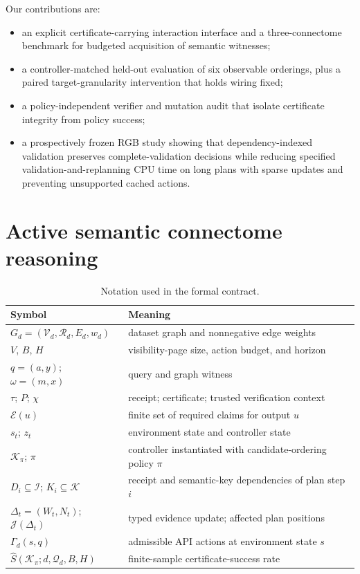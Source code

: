 \documentclass{article}
\begin{document}
Our contributions are:

\begin{itemize}[leftmargin=*,itemsep=1pt,topsep=2pt]
  \item an explicit certificate-carrying interaction interface and a
  three-connectome benchmark for budgeted acquisition of semantic witnesses;
  \item a controller-matched held-out evaluation of six observable
  orderings, plus a paired target-granularity intervention that holds wiring fixed;
  \item a policy-independent verifier and mutation audit that isolate certificate integrity
  from policy success;
  \item a prospectively frozen RGB study showing that dependency-indexed
  validation preserves complete-validation decisions while reducing specified
  validation-and-replanning CPU time on long plans with sparse updates and preventing
  unsupported cached actions.
\end{itemize}

\section{Active semantic connectome reasoning}
\label{sec:task}

\begin{table}[t]
\caption{Notation used in the formal contract.}
\label{tab:notation}
\centering
\scriptsize
\setlength{\tabcolsep}{4pt}
\begin{tabular}{ll}
\toprule
Symbol & Meaning \\
\midrule
$G_d=(\mathcal V_d,\mathcal R_d,E_d,w_d)$ & dataset graph and nonnegative edge weights \\
$V$, $B$, $H$ & visibility-page size, action budget, and horizon \\
$q=(a,y)$; $\omega=(m,x)$ & query and graph witness \\
$\tau$; $P$; $\chi$ & receipt; certificate; trusted verification context \\
$\mathcal E(u)$ & finite set of required claims for output $u$ \\
$s_t$; $z_t$ & environment state and controller state \\
$\mathcal K_\pi$; $\pi$ & controller instantiated with candidate-ordering policy $\pi$ \\
$D_i\subseteq\mathcal I$; $K_i\subseteq\mathcal K$ & receipt and semantic-key dependencies of plan step $i$ \\
$\Delta_t=(W_t,N_t)$; $\mathcal J(\Delta_t)$ & typed evidence update; affected plan positions \\
$\Gamma_d(s,q)$ & admissible API actions at environment state $s$ \\
$\widehat S(\mathcal K_\pi;d,\mathcal Q_d,B,H)$ & finite-sample certificate-success rate \\
\bottomrule
\end{tabular}
\end{table}
\end{document}
